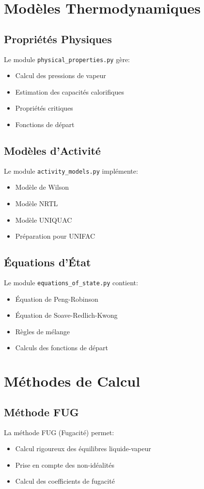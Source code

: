 \documentclass[12pt,a4paper]{report}
\begin{document}
\chapter{Modèles Thermodynamiques}
\section{Propriétés Physiques}
Le module \texttt{physical\_properties.py} gère:
\begin{itemize}
    \item Calcul des pressions de vapeur
    \item Estimation des capacités calorifiques
    \item Propriétés critiques
    \item Fonctions de départ
\end{itemize}

\section{Modèles d'Activité}
Le module \texttt{activity\_models.py} implémente:
\begin{itemize}
    \item Modèle de Wilson
    \item Modèle NRTL
    \item Modèle UNIQUAC
    \item Préparation pour UNIFAC
\end{itemize}

\section{Équations d'État}
Le module \texttt{equations\_of\_state.py} contient:
\begin{itemize}
    \item Équation de Peng-Robinson
    \item Équation de Soave-Redlich-Kwong
    \item Règles de mélange
    \item Calculs des fonctions de départ
\end{itemize}

\chapter{Méthodes de Calcul}
\section{Méthode FUG}
La méthode FUG (Fugacité) permet:
\begin{itemize}
    \item Calcul rigoureux des équilibres liquide-vapeur
    \item Prise en compte des non-idéalités
    \item Calcul des coefficients de fugacité
\end{itemize}
\end{document}
